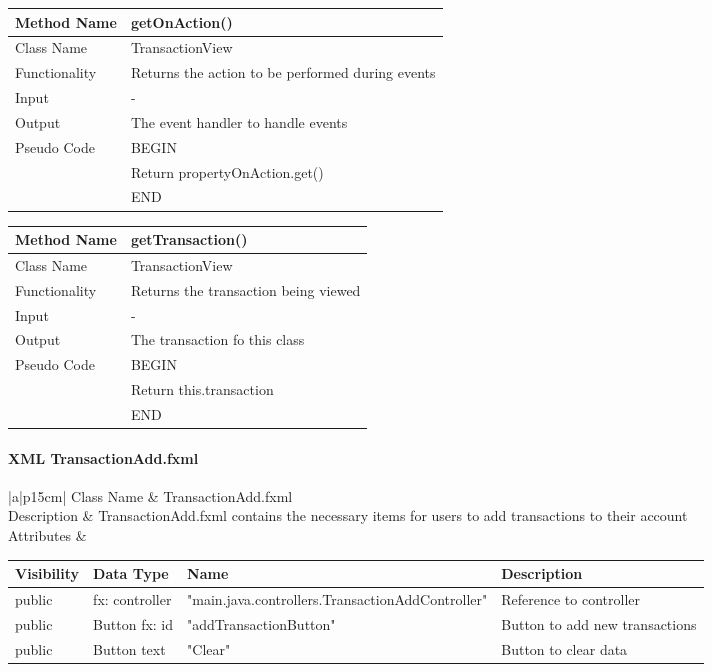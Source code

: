 \documentclass[12pt]{article}
\begin{document}
\begin{tabular}{ |p{3cm}||p{\colWidth}|  }
	\hline
	Method Name &  getOnAction()\\
	\hline
	Class Name & TransactionView\\
	\hline
	Functionality & Returns the action to be performed during events\\
	\hline
	Input & -\\
	\hline
	Output & The event handler to handle events \\
	\hline
	Pseudo Code&BEGIN\\ & Return propertyOnAction.get() \\&END\\
	\hline
\end{tabular}

\begin{tabular}{ |p{3cm}||p{\colWidth}|  }
	\hline
	Method Name &  getTransaction()\\
	\hline
	Class Name & TransactionView\\
	\hline
	Functionality & Returns the transaction being viewed\\
	\hline
	Input & -\\
	\hline
	Output & The transaction fo this class \\
	\hline
	Pseudo Code&BEGIN\\ & Return this.transaction \\&END\\
	\hline
\end{tabular}    

\paragraph{XML TransactionAdd.fxml}
\begin{table}[H]
	\begin{tabular}{|a|p{15cm}|}
		\hline
		{Class Name} & {TransactionAdd.fxml} \\
		\hline
		Description & TransactionAdd.fxml contains the necessary items for users to add transactions to their account\\
		\hline
		Attributes & 
		\begin{tabular}{| p{1.5cm} | p{2.0cm} | p{6.5cm} | p{3.45cm} |}
			\hline
			\rowcolor{lightgray}
			Visibility & Data Type & Name & Description \\
			\hline
			\rowcolor{white}
			public & fx: controller & "main.java.controllers.TransactionAddController" &  Reference to controller\\
			\hline
			public & Button fx: id  & "addTransactionButton" & Button to add new transactions\\
			\hline
			public & Button text & "Clear" & Button to clear data\\	
			\hline
		\end{tabular} \\
		\hline	 								 
	\end{tabular}
\end{table}
\end{document}
